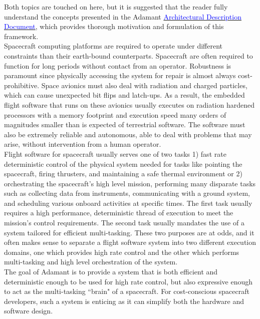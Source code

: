 Both topics are touched on here, but it is suggested that the reader fully understand the concepts presented in the Adamant \href{https://github.com/lasp/adamant/blob/main/doc/architecture_description_document/architecture_description_document.pdf}{\textcolor{blue}{Architectural Description Document}}, which provides thorough motivation and formulation of this framework. \\

Spacecraft computing platforms are required to operate under different constraints than their earth-bound counterparts. Spacecraft are often required to function for long periods without contact from an operator. Robustness is paramount since physically accessing the system for repair is almost always cost-prohibitive. Space avionics must also deal with radiation and charged particles, which can cause unexpected bit flips and latch-ups. As a result, the embedded flight software that runs on these avionics usually executes on radiation hardened processors with a memory footprint and execution speed many orders of magnitudes smaller than is expected of terrestrial software. The software must also be extremely reliable and autonomous, able to deal with problems that may arise, without intervention from a human operator. \\

Flight software for spacecraft usually serves one of two tasks 1) fast rate deterministic control of the physical system needed for tasks like pointing the spacecraft, firing thrusters, and maintaining a safe thermal environment or 2) orchestrating the spacecraft's high level mission, performing many disparate tasks such as collecting data from instruments, communicating with a ground system, and scheduling various onboard activities at specific times. The first task usually requires a high performance, deterministic thread of execution to meet the mission's control requirements. The second task usually mandates the use of a system tailored for efficient multi-tasking. These two purposes are at odds, and it often makes sense to separate a flight software system into two different execution domains, one which provides high rate control and the other which performs multi-tasking and high level orchestration of the system. \\

The goal of Adamant is to provide a system that is both efficient and deterministic enough to be used for high rate control, but also expressive enough to act as the multi-tasking ``brain" of a spacecraft. For cost-conscious spacecraft developers, such a system is enticing as it can simplify both the hardware and software design. \\

